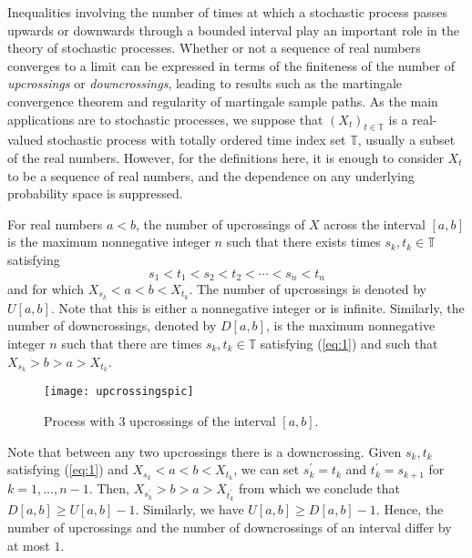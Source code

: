 \documentclass[12pt]{article}
\begin{document}

Inequalities involving the number of times at which a stochastic process passes upwards or downwards through a bounded interval play an important role in the theory of stochastic processes. Whether or not a sequence of real numbers converges to a limit can be expressed in terms of the finiteness of the number of \emph{upcrossings} or \emph{downcrossings}, leading to results such as the martingale convergence theorem and regularity of martingale sample paths.
As the main applications are to stochastic processes, we suppose that $(X_t)_{t\in\mathbb{T}}$ is a real-valued stochastic process with totally ordered time index set $\mathbb{T}$, usually a subset of the real numbers. However, for the definitions here, it is enough to consider $X_t$ to be a sequence of real numbers, and the dependence on any underlying probability space is suppressed.

For real numbers $a<b$, the number of upcrossings of $X$ across the interval $[a,b]$ is the maximum nonnegative integer $n$ such that there exists times $s_k,t_k\in\mathbb{T}$ satisfying
\begin{equation}
s_1<t_1<s_2<t_2<\cdots<s_n<t_n\label{eq:1}
\end{equation}
and for which $X_{s_k}<a<b<X_{t_k}$. The number of upcrossings is denoted by $U[a,b]$. Note that this is either a nonnegative integer or is infinite. Similarly, the number of downcrossings, denoted by $D[a,b]$, is the maximum nonnegative integer $n$ such that there are times $s_k,t_k\in\mathbb{T}$ satisfying (\ref{eq:1}) and such that $X_{s_k}>b>a>X_{t_k}$.

\begin{figure}[H]
\centering
\texttt{[image: upcrossingspic]}
\caption{Process with 3 upcrossings of the interval $[a,b]$.}
\label{fig:1}
\end{figure}

Note that between any two upcrossings there is a downcrossing. Given $s_k,t_k$ satisfying (\ref{eq:1}) and $X_{s_k}<a<b<X_{t_k}$, we can set $s^\prime_k=t_k$ and $t^\prime_k=s_{k+1}$ for $k=1,\ldots,n-1$. Then, $X_{s^\prime_k}>b>a>X_{t^\prime_k}$ from which we conclude that $D[a,b]\ge U[a,b]-1$. Similarly, we have $U[a,b]\ge D[a,b]-1$. Hence, the number of upcrossings and the number of downcrossings of an interval differ by at most $1$.
\end{document}
